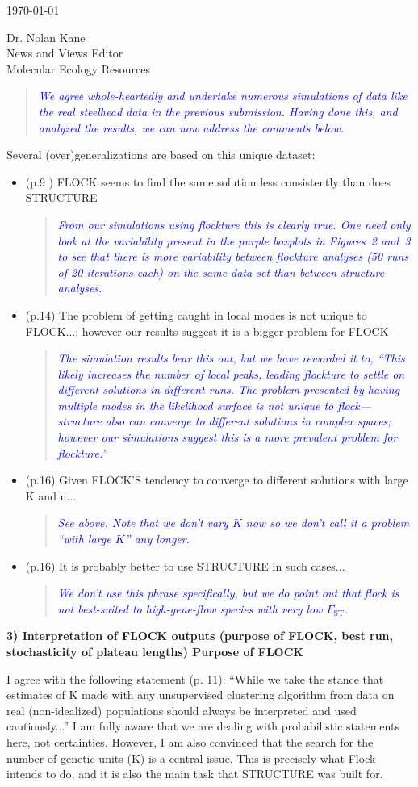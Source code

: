 \documentclass[11pt]{letter}
\newcommand{\reply}[1]{\begin{quotation}\small\sl\textcolor{blue}{#1}\end{quotation}}
\begin{document}
\begin{letter}{ \today 

Dr. Nolan Kane\\
News and Views Editor\\
Molecular Ecology Resources \\
}
\reply{We agree whole-heartedly and undertake numerous simulations of data like the real
steelhead data in the previous submission.  Having done this, and analyzed the results,
we can now address the comments below.}
Several (over)generalizations are based on this unique dataset:
\begin{itemize}
\item (p.9 ) FLOCK seems to find the same solution less consistently than does STRUCTURE
\reply{From our simulations using {\sc flockture} this is clearly true.  One need only look
at the variability present in the purple boxplots in Figures~2 and~3 to see that there is more
variability between {\sc flockture} analyses (50 runs of 20 iterations each) on the same data set 
than between {\sc structure} analyses. }
\item (p.14) The problem of getting caught in local modes is not unique to FLOCK...; however our results suggest it is a bigger problem for FLOCK
\reply{The simulation results bear this out, but we have reworded it to, ``This likely 
increases the number of
local peaks, leading {\sc flockture} to settle on different solutions in 
different runs. The problem presented by having multiple modes in the likelihood surface 
is not unique to {\sc flock}---{\sc structure} also can converge to 
different solutions in complex spaces; however our simulations suggest this is a more  
prevalent problem for {\sc flockture}.''
}
\item (p.16) Given FLOCK'S tendency to converge to different solutions with large K and n...
\reply{See above.  Note that we don't vary $K$ now so we don't call it a problem ``with large $K$'' any
longer.}
\item (p.16) It is probably better to use STRUCTURE in such cases...
\reply{We don't use this phrase specifically, but we do point out that {\sc flock} is not best-suited to high-gene-flow
species with very low $F_\mathrm{ST}$.}
\end{itemize}

{\bf 3) Interpretation of FLOCK outputs (purpose of FLOCK, best run, stochasticity of plateau lengths)
Purpose of FLOCK}

I agree with the following statement (p. 11):
``While we take the stance that estimates of K made with any unsupervised clustering algorithm from data on real (non-idealized) populations should always be interpreted and used cautiously...''
I am fully aware that we are dealing with probabilistic statements here, not certainties. However, I am also convinced that the search for the number of genetic units (K) is a central issue. This is precisely what Flock intends to do, and it is also the main task that STRUCTURE was built for.


\end{letter}
\end{document}
